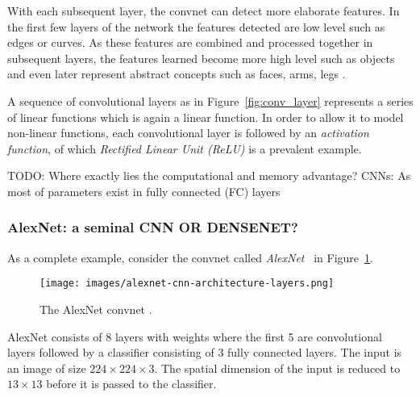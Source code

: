 \documentclass[12pt,a4paper]{article}
\begin{document}
With each subsequent layer, the convnet can detect more elaborate features. In the first few layers of the network the features detected are low level such as edges or curves. As these features are combined and processed together in subsequent layers, the features learned become more high level such as objects and even later represent abstract concepts such as faces, arms, legs \cite{DeepVis}.

A sequence of convolutional layers as in Figure~\ref{fig:conv_layer} represents a series of linear functions which is again a linear function. In order to allow it to model non-linear functions, each convolutional layer is followed by an \textit{activation function}, of which \textit{Rectified Linear Unit (ReLU)} is a prevalent example.

\par TODO: Where exactly lies the computational and memory advantage? CNNs: As most of parameters exist in fully connected (FC) layers

\subsubsection{AlexNet: a seminal CNN OR DENSENET?}
As a complete example, consider the convnet called \textit{AlexNet}~\cite{AlexNet} in Figure~\ref{fig:AlexNet}.
\begin{figure}[ht]
\centering
\texttt{[image: images/alexnet-cnn-architecture-layers.png]}
\caption{The AlexNet convnet \cite{AlexNet}.}
\label{fig:AlexNet}
\end{figure}
AlexNet consists of 8 layers with weights where the first 5 are convolutional layers followed by a classifier consisting of 3  fully connected layers. The input is an image of size $224 \times 224 \times 3$. The spatial dimension of the input is reduced to $13 \times 13$ before it is passed to the classifier. 
\end{document}
